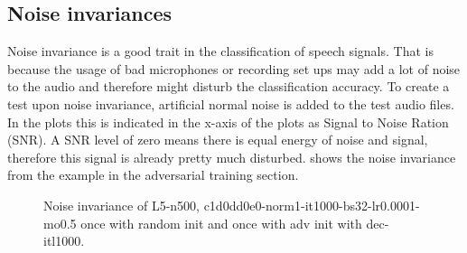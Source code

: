 
\subsection{Noise invariances}
Noise invariance is a good trait in the classification of speech signals.
That is because the usage of bad microphones or recording set ups may add a lot of noise to the audio and therefore might disturb the classification accuracy.
To create a test upon noise invariance, artificial normal noise is added to the test audio files.
In the plots this is indicated in the x-axis of the plots as Signal to Noise Ration (SNR).
A SNR level of zero means there is equal energy of noise and signal, therefore this signal is already pretty much disturbed.
 shows the noise invariance from the example in the adversarial training section.

\begin{figure}[!ht]
  \centering
  \caption{Noise invariance of L5-n500, c1d0dd0e0-norm1-it1000-bs32-lr0.0001-mo0.5 once with random init and once with adv init with dec-itl1000.}
  \label{fig:exp_tb_noise_fc3}
\end{figure}
\FloatBarrier
\noindent